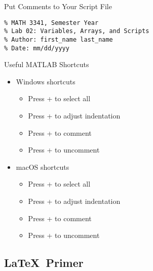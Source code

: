 \begin{frame}[fragile]{Put Comments to Your Script File}
\protect\hypertarget{put-comments-to-your-script-file}{}
\begin{verbatim}
% MATH 3341, Semester Year
% Lab 02: Variables, Arrays, and Scripts
% Author: first_name last_name
% Date: mm/dd/yyyy
\end{verbatim}
\end{frame}

\begin{frame}{Useful MATLAB Shortcuts}
\protect\hypertarget{useful-matlab-shortcuts}{}
\begin{itemize}[<+->]
\tightlist
\item
  Windows shortcuts

  \begin{itemize}[<+->]
  \tightlist
  \item
    Press  +  to select all
  \item
    Press  +  to adjust indentation
  \item
    Press  +  to comment
  \item
    Press  +  to uncomment
  \end{itemize}
\item
  macOS shortcuts

  \begin{itemize}[<+->]
  \tightlist
  \item
    Press  +  to select all
  \item
    Press  +  to adjust
    indentation
  \item
    Press  + \fbox{\texttt{/}} to comment
  \item
    Press  +  to uncomment
  \end{itemize}
\end{itemize}
\end{frame}

\hypertarget{primer}{%
\subsection{\texorpdfstring{\LaTeX~Primer}{~Primer}}\label{primer}}

